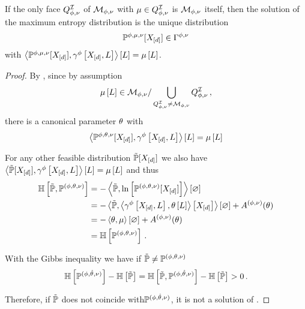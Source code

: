 \begin{theorem}\label{the:maxEntropyInterior}
    If the only face $Q^{\mathcal{I}}_{\phi,\nu}$ of $\mathcal{M}_{\phi,\nu}$ with $\mu\in Q^{\mathcal{I}}_{\phi,\nu}$ is $\mathcal{M}_{\phi,\nu}$ itself, then the solution of the maximum entropy distribution is the unique distribution
    \begin{align*}
        \mathbb{P}^{\phi,\mu,\nu}[X_{[d]}]\in\Gamma^{\phi,\nu}
    \end{align*}
    with $\left\langle \mathbb{P}^{\phi,\mu,\nu}[X_{[d]}],\gamma^{\phi}\left[X_{[d]},L\right]\right\rangle \left[ L \right]=\mu\left[L\right]$.
\end{theorem}
\begin{proof}
    By , since by assumption
    \begin{align*}
        \mu\left[L\right] \in \mathcal{M}_{\phi,\nu} / \bigcup_{Q^{\mathcal{I}}_{\phi,\nu}\neq\mathcal{M}_{\phi,\nu}} Q^{\mathcal{I}}_{\phi,\nu} \, ,
    \end{align*}
    there is a canonical parameter $\theta$ with
    \begin{align*}
        \left\langle \mathbb{P}^{\phi,\theta,\nu}[X_{[d]}],\gamma^{\phi}\left[X_{[d]},L\right]\right\rangle \left[ L \right]=\mu\left[L\right]
    \end{align*}

    For any other feasible distribution $\tilde{\mathbb{P}}[X_{[d]}]$ we also have $\left\langle \tilde{\mathbb{P}}[X_{[d]}],\gamma^{\phi}\left[X_{[d]},L\right]\right\rangle \left[ L \right]=\mu\left[L\right]$ and thus
    \begin{align*}
        \mathbb{H}\left[\tilde{\mathbb{P}},\mathbb{P}^{(\phi,\theta,\nu)}\right]
        &= -\left\langle \tilde{\mathbb{P}},\ln \left[ \mathbb{P}^{(\phi,\theta,\nu)}[X_{[d]}] \right]\right\rangle \left[ \varnothing \right] \\
        &= -\left\langle \tilde{\mathbb{P}},\left\langle \gamma^{\phi}\left[X_{[d]},L\right],\theta\left[L\right]\right\rangle \left[ X_{[d]} \right]\right\rangle \left[ \varnothing \right] + A^{(\phi,\nu)}(\theta) \\
        &= - \left\langle \theta,\mu\right\rangle \left[ \varnothing \right] + A^{(\phi,\nu)}(\theta) \\
        &= \mathbb{H}\left[\mathbb{P}^{(\phi,\theta,\nu)}\right] \, .
    \end{align*}

    With the Gibbs inequality we have if $\tilde{\mathbb{P}}\neq\mathbb{P}^{(\phi,\theta,\nu)}$
    \begin{align*}
        \mathbb{H}\left[\mathbb{P}^{(\phi,\hat{\theta},\nu)}\right] - \mathbb{H}\left[\tilde{\mathbb{P}}\right]
        = \mathbb{H}\left[\tilde{\mathbb{P}},\mathbb{P}^{(\phi,\hat{\theta},\nu)}\right] - \mathbb{H}\left[\tilde{\mathbb{P}}\right] > 0 \, .
    \end{align*}

    Therefore, if $\tilde{\mathbb{P}}$ does not coincide with$\mathbb{P}^{(\phi,\hat{\theta},\nu)}$, it is not a solution of .
\end{proof}


